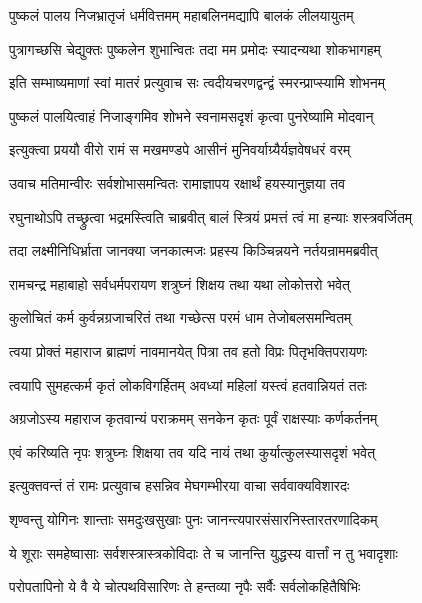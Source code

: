 \twolineshloka
{पुष्कलं पालय निजभ्रातृजं धर्मवित्तमम्}
{महाबलिनमद्यापि बालकं लीलयायुतम्}%

\twolineshloka
{पुत्रागच्छसि चेद्युक्तः पुष्कलेन शुभान्वितः}
{तदा मम प्रमोदः स्यादन्यथा शोकभागहम्}%

\twolineshloka
{इति सम्भाष्यमाणां स्वां मातरं प्रत्युवाच सः}
{त्वदीयचरणद्वन्द्वं स्मरन्प्राप्स्यामि शोभनम्}%

\twolineshloka
{पुष्कलं पालयित्वाहं निजाङ्गमिव शोभने}
{स्वनामसदृशं कृत्वा पुनरेष्यामि मोदवान्}%

\twolineshloka
{इत्युक्त्वा प्रययौ वीरो रामं स मखमण्डपे}
{आसीनं मुनिवर्याग्र्यैर्यज्ञवेषधरं वरम्}%

\twolineshloka
{उवाच मतिमान्वीरः सर्वशोभासमन्वितः}
{रामाज्ञापय रक्षार्थं हयस्यानुज्ञया तव}%

\twolineshloka
{रघुनाथोऽपि तच्छ्रुत्वा भद्रमस्त्विति चाब्रवीत्}
{बालं स्त्रियं प्रमत्तं त्वं मा हन्याः शस्त्रवर्जितम्}%

\twolineshloka
{तदा लक्ष्मीनिधिर्भ्राता जानक्या जनकात्मजः}
{प्रहस्य किञ्चिन्नयने नर्तयन्राममब्रवीत्}%


\twolineshloka
{रामचन्द्र महाबाहो सर्वधर्मपरायण}
{शत्रुघ्नं शिक्षय तथा यथा लोकोत्तरो भवेत्}%

\twolineshloka
{कुलोचितं कर्म कुर्वन्नग्रजाचरितं तथा}
{गच्छेत्स परमं धाम तेजोबलसमन्वितम्}%

\twolineshloka
{त्वया प्रोक्तं महाराज ब्राह्मणं नावमानयेत्}
{पित्रा तव हतो विप्रः पितृभक्तिपरायणः}%

\twolineshloka
{त्वयापि सुमहत्कर्म कृतं लोकविगर्हितम्}
{अवध्यां महिलां यस्त्वं हतवान्नियतं ततः}%

\twolineshloka
{अग्रजोऽस्य महाराज कृतवान्यं पराक्रमम्}
{सनकेन कृतः पूर्वं राक्षस्याः कर्णकर्तनम्}%

\twolineshloka
{एवं करिष्यति नृपः शत्रुघ्नः शिक्षया तव}
{यदि नायं तथा कुर्यात्कुलस्यासदृशं भवेत्}%

\twolineshloka
{इत्युक्तवन्तं तं रामः प्रत्युवाच हसन्निव}
{मेघगम्भीरया वाचा सर्ववाक्यविशारदः}%

\twolineshloka
{शृण्वन्तु योगिनः शान्ताः समदुःखसुखाः पुनः}
{जानन्त्यपारसंसारनिस्तारतरणादिकम्}%

\twolineshloka
{ये शूराः समहेष्वासाः सर्वशस्त्रास्त्रकोविदाः}
{ते च जानन्ति युद्धस्य वार्त्तां न तु भवादृशाः}%

\twolineshloka
{परोपतापिनो ये वै ये चोत्पथविसारिणः}
{ते हन्तव्या नृपैः सर्वैः सर्वलोकहितैषिभिः}%

